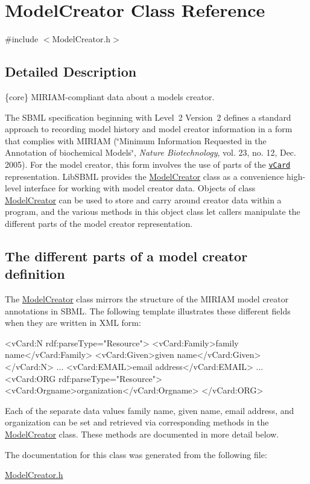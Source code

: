 \hypertarget{class_model_creator}{}\section{Model\+Creator Class Reference}
\label{class_model_creator}


{\ttfamily \#include $<$Model\+Creator.\+h$>$}



\subsection{Detailed Description}
\{core\} M\+I\+R\+I\+A\+M-\/compliant data about a model\textquotesingle{}s creator.



The S\+B\+ML specification beginning with Level~2 Version~2 defines a standard approach to recording model history and model creator information in a form that complies with M\+I\+R\+I\+AM (\char`\"{}\+Minimum Information
  Requested in the Annotation of biochemical Models\char`\"{}, {\itshape Nature Biotechnology}, vol. 23, no. 12, Dec. 2005). For the model creator, this form involves the use of parts of the \href{http://en.wikipedia.org/wiki/VCard}{\tt v\+Card} representation. Lib\+S\+B\+ML provides the \hyperlink{class_model_creator}{Model\+Creator} class as a convenience high-\/level interface for working with model creator data. Objects of class \hyperlink{class_model_creator}{Model\+Creator} can be used to store and carry around creator data within a program, and the various methods in this object class let callers manipulate the different parts of the model creator representation.\hypertarget{class_model_creator_parts}{}\subsection{The different parts of a model creator definition}\label{class_model_creator_parts}
The \hyperlink{class_model_creator}{Model\+Creator} class mirrors the structure of the M\+I\+R\+I\+AM model creator annotations in S\+B\+ML. The following template illustrates these different fields when they are written in X\+ML form\+:


\begin{DoxyPre}
<vCard:N rdf:parseType="Resource">
  <vCard:Family>family name</vCard:Family>
  <vCard:Given>given name</vCard:Given>
</vCard:N>
...
<vCard:EMAIL>email address</vCard:EMAIL>
...
<vCard:ORG rdf:parseType="Resource">
  <vCard:Orgname>organization</vCard:Orgname>
</vCard:ORG>
\end{DoxyPre}


Each of the separate data values family name, given name, email address, and organization can be set and retrieved via corresponding methods in the \hyperlink{class_model_creator}{Model\+Creator} class. These methods are documented in more detail below. 

The documentation for this class was generated from the following file\+:\begin{DoxyCompactItemize}
\item 
\hyperlink{_model_creator_8h}{Model\+Creator.\+h}\end{DoxyCompactItemize}
